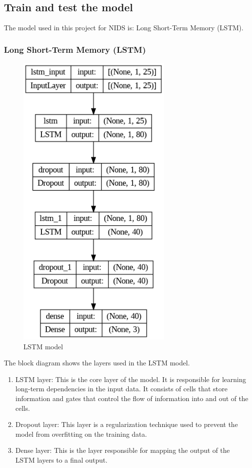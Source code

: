 \subsection{Train and test the model}
\vspace{-18pt}
The model used in this project for NIDS is: Long Short-Term Memory (LSTM).
\par 
\subsubsection{Long Short-Term Memory (LSTM)}
\vspace{-18pt}
\begin{figure}[tbh]
	\begin{center}
		\includegraphics[width=3in]{images/lstm_model.png}
		\caption{LSTM model}
		\label{LSTM model}
	\end{center}
\end{figure}
\newpage
The block diagram shows the layers used in the LSTM model.
\begin{enumerate}[label=\roman*.]
	\item LSTM layer: This is the core layer of the model. It is responsible for learning long-term dependencies in the input data. It consists of cells that store information and gates that control the flow of information into and out of the cells.
	\item Dropout layer: This layer is a regularization technique used to prevent the model from overfitting on the training data.
	\item Dense layer: This is the layer responsible for mapping the output of the LSTM layers to a final output. 
\end{enumerate}
